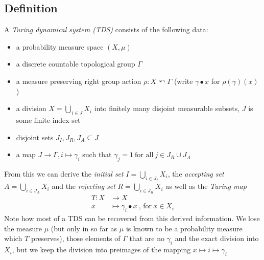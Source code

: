 \subsection{Definition}

\begin{Definition}
	A \emph{Turing dynamical system (TDS)} consists of the following data:
	\begin{itemize}
		\item{a probability measure space $(X,\mu)$}
		\item{a discrete countable topological group $\Gamma$}
		\item{a measure preserving right group action $\rho : X \curvearrowleft \Gamma$ (write $\gamma \bullet x$ for $\rho(\gamma)(x)$)}
		\item{a division $X = \dot\bigcup_{i \in J} X_i$ into finitely many disjoint measurable subsets, $J$ is some finite index set}
		\item{disjoint sets $J_I, J_R, J_A \subseteq J$}
		\item{a map $J \to \Gamma, i \mapsto \gamma_i$ such that $\gamma_j = 1~\text{for all}~ j \in J_R \cup J_A$}
	\end{itemize}
\end{Definition}
From this we can derive the \emph{initial set} $I = \bigcup_{i\in J_I} X_i$, the \emph{accepting set} $A = \bigcup_{i \in J_A} X_i$ and the \emph{rejecting set} $R = \bigcup_{i \in J_R} X_i$ as well as the \emph{Turing map}
\begin{align*}
	T : X &\to X \\
	x &\mapsto \gamma_i \bullet x~\text{, for}~x \in X_i
\end{align*}
Note how most of a TDS can be recovered from this derived information.
We lose the measure $\mu$ (but only in so far as $\mu$ is known to be a probability measure which $T$ preserves),
those elements of $\Gamma$ that are no $\gamma_i$
and the exact division into $X_i$, but we keep the division into preimages of the mapping $x \mapsto i \mapsto \gamma_i$
